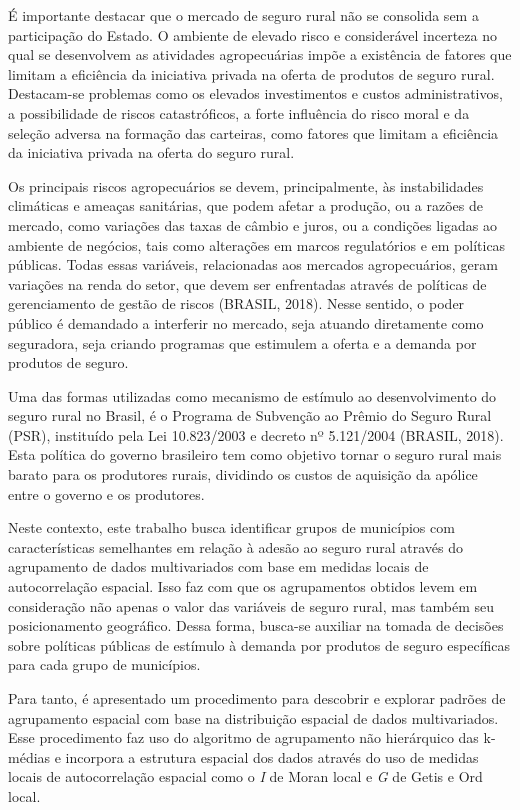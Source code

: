 \documentclass[
	12pt,				%
	openright,			%
	oneside,			%
	a4paper,			%
	chapter=TITLE,		%
	section=TITLE,		%
	english,			%
	french,				%
	spanish,			%
	brazil				%
	]{abntex2}
\begin{document}
É importante destacar que o mercado de seguro rural não se consolida sem a participação do Estado. O ambiente de elevado risco e considerável incerteza no qual se desenvolvem as atividades agropecuárias impõe a existência de fatores que limitam a eficiência da iniciativa privada na oferta de produtos de seguro rural. Destacam-se problemas como os elevados investimentos e custos administrativos, a possibilidade de riscos catastróficos, a forte influência do risco moral e da seleção adversa na formação das carteiras, como fatores que limitam a eficiência da iniciativa privada na oferta do seguro rural. 

Os principais riscos agropecuários se devem, principalmente, às instabilidades climáticas e ameaças sanitárias, que podem afetar a produção, ou a razões de mercado, como variações das taxas de câmbio e juros, ou a condições ligadas ao ambiente de negócios, tais como alterações em marcos regulatórios e em políticas públicas. Todas essas variáveis, relacionadas aos mercados agropecuários, geram variações na renda do setor, que devem ser enfrentadas através de políticas de gerenciamento de gestão de riscos (BRASIL, 2018). Nesse sentido, o poder público é demandado a interferir no mercado, seja atuando diretamente como seguradora, seja criando programas que estimulem a oferta e a demanda por produtos de seguro.

Uma das formas utilizadas como mecanismo de estímulo ao desenvolvimento do seguro rural no Brasil, é o Programa de Subvenção ao Prêmio do Seguro Rural (PSR), instituído pela Lei 10.823/2003 e decreto nº 5.121/2004 (BRASIL, 2018). Esta política do governo brasileiro tem como objetivo tornar o seguro rural mais barato para os produtores rurais, dividindo os custos de aquisição da apólice entre o governo e os produtores. 

Neste contexto, este trabalho busca identificar grupos de municípios com características semelhantes em relação à adesão ao seguro rural através do agrupamento de dados multivariados com base em medidas locais de autocorrelação espacial. Isso faz com  que os agrupamentos obtidos levem em consideração não apenas o valor das variáveis de seguro rural, mas também seu posicionamento geográfico. Dessa forma, busca-se auxiliar na tomada de decisões sobre políticas públicas de estímulo à demanda por produtos de seguro específicas para cada grupo de municípios. 

Para tanto, é apresentado um procedimento para descobrir e explorar padrões de agrupamento espacial com base na distribuição espacial de dados multivariados. Esse procedimento faz uso do algoritmo de agrupamento não hierárquico das k-médias e incorpora a estrutura espacial dos dados através do uso de medidas locais de autocorrelação espacial como o \textit{I} de Moran local e \textit{G} de Getis e Ord local. 
\end{document}
